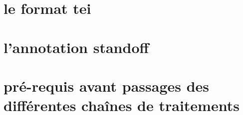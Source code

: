 \section{le format tei}
\section{l'annotation standoff}
\section{pré-requis avant passages des différentes chaînes de traitements}
